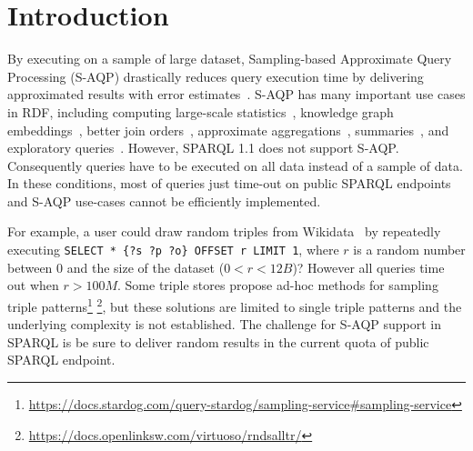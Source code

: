 
\section{Introduction}

By executing on a sample of large dataset, Sampling-based Approximate
Query Processing (S-AQP) drastically reduces query execution time by
delivering approximated results with error
estimates~\cite{DBLP:conf/sigmod/AgarwalMKTJMMS14}. S-AQP has many
important use cases in RDF, including computing large-scale
statistics~\cite{soulet2019anytime,10.1007/978-3-319-18818-8_14},
knowledge graph embeddings~\cite{ristoski2016rdf2vec}, better join
orders~\cite{DBLP:conf/cidr/LeisRGK017}, approximate
aggregations~\cite{wang2022approximate},
summaries~\cite{10.1007/978-3-030-49461-2_10}, and exploratory
queries~\cite{DBLP:conf/sigmod/AgarwalMKTJMMS14}.
%
However, SPARQL 1.1 does not support S-AQP. Consequently queries have
to be executed on all data instead of a sample of data. In these
conditions, most of queries just time-out on public SPARQL endpoints
and S-AQP use-cases cannot be efficiently implemented.

%
For example, a user could draw random triples from Wikidata~\cite{soulet2019anytime}
by repeatedly executing \verb|SELECT * {?s ?p ?o} OFFSET r LIMIT 1|,
where $r$ is a random number between $0$ and
the size of the dataset ($0<r<12B$)? However all queries time out when $r > 100M$.
Some triple stores propose ad-hoc methods for sampling
triple patterns\footnote{\url{https://docs.stardog.com/query-stardog/sampling-service\#sampling-service}}
\footnote{\url{https://docs.openlinksw.com/virtuoso/rndsalltr/}},
but these solutions are limited to single triple patterns and the
underlying complexity is not established.
The challenge for S-AQP support in SPARQL is be sure to deliver random
results in the current quota of public SPARQL endpoint.

